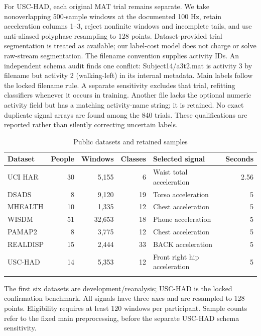 \documentclass[pdflatex,sn-basic,Numbered,iicol]{sn-jnl}
\begin{document}
For USC-HAD, each original MAT trial remains separate. We take nonoverlapping 500-sample windows at the documented 100 Hz, retain acceleration columns 1--3, reject nonfinite windows and incomplete tails, and use anti-aliased polyphase resampling to 128 points. Dataset-provided trial segmentation is treated as available; our label-cost model does not charge or solve raw-stream segmentation. The filename convention supplies activity IDs. An independent schema audit finds one conflict: Subject14/a3t2.mat is activity 3 by filename but activity 2 (walking-left) in its internal metadata. Main labels follow the locked filename rule. A separate sensitivity excludes that trial, refitting classifiers whenever it occurs in training. Another file lacks the optional numeric activity field but has a matching activity-name string; it is retained. No exact duplicate signal arrays are found among the 840 trials. These qualifications are reported rather than silently correcting uncertain labels.


\begin{table}[t]
\centering\small\setlength{\tabcolsep}{3pt}
\caption{Public datasets and retained samples}\label{tab:data}
\begin{tabular}{lrrrlr}
\toprule
Dataset & People & Windows & Classes & Selected signal & Seconds \\
\midrule
UCI HAR & 30 & 5,155 & 6 & Waist total acceleration & 2.56 \\
DSADS & 8 & 9,120 & 19 & Torso acceleration & 5 \\
MHEALTH & 10 & 1,335 & 12 & Chest acceleration & 5 \\
WISDM & 51 & 32,653 & 18 & Phone acceleration & 5 \\
PAMAP2 & 8 & 3,775 & 12 & Chest acceleration & 5 \\
REALDISP & 15 & 2,444 & 33 & BACK acceleration & 5 \\
USC-HAD & 14 & 5,353 & 12 & Front right hip acceleration & 5 \\
\botrule
\end{tabular}
\begin{minipage}{\textwidth}\footnotesize The first six datasets are development/reanalysis; USC-HAD is the locked confirmation benchmark. All signals have three axes and are resampled to 128 points. Eligibility requires at least 120 windows per participant. Sample counts refer to the fixed main preprocessing, before the separate USC-HAD schema sensitivity.\end{minipage}
\end{table}
\end{document}
